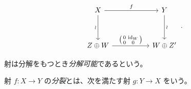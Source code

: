 \begin{equation*}
  \begin{tikzcd}[ampersand replacement=\&,column sep=5.2em,row sep=3.4em]
    X \arrow[r,"f"] \arrow[d,"\wr"']
      \& Y \arrow[d,"\wr"] \\
    Z\oplus W
      \arrow[r,"{\left(\begin{smallmatrix}0&\operatorname{id}_W\\0&0\end{smallmatrix}\right)}"]
      \& W\oplus Z'
  \end{tikzcd}\,.
\end{equation*}

射は分解をもつとき\emph{分解可能}であるという。

射 $f\colon X\longrightarrow Y$ の\emph{分裂}とは、次を満たす射
$g\colon Y\longrightarrow X$ をいう。
\endgroup
